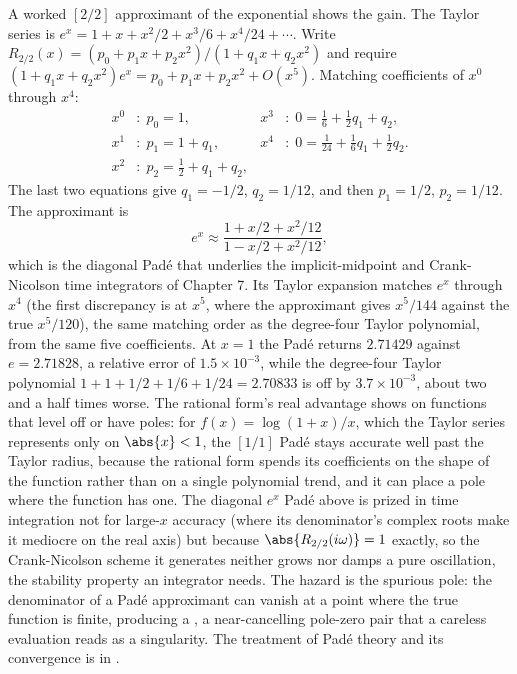 A worked $[2/2]$ approximant of the exponential shows the gain. The
Taylor series is $e^{x} = 1 + x + x^{2}/2 + x^{3}/6 + x^{4}/24 +
\cdots$. Write $R_{2/2}(x) = (p_{0} + p_{1} x + p_{2} x^{2})/(1 + q_{1}
x + q_{2} x^{2})$ and require $(1 + q_{1} x + q_{2} x^{2}) e^{x} = p_{0}
+ p_{1} x + p_{2} x^{2} + O(x^{5})$. Matching coefficients of $x^{0}$
through $x^{4}$:
\begin{align*}
x^{0}&: \; p_{0} = 1, & x^{3}&: \; 0 = \tfrac{1}{6} +
\tfrac{1}{2} q_{1} + q_{2}, \\
x^{1}&: \; p_{1} = 1 + q_{1}, & x^{4}&: \; 0 = \tfrac{1}{24} +
\tfrac{1}{6} q_{1} + \tfrac{1}{2} q_{2}. \\
x^{2}&: \; p_{2} = \tfrac{1}{2} + q_{1} + q_{2},
\end{align*}
The last two equations give $q_{1} = -1/2$, $q_{2} = 1/12$, and then
$p_{1} = 1/2$, $p_{2} = 1/12$. The approximant is
\[
e^{x} \approx \frac{1 + x/2 + x^{2}/12}{1 - x/2 + x^{2}/12},
\]
which is the diagonal Pad\'{e} that underlies the implicit-midpoint and
Crank-Nicolson time integrators of Chapter 7. Its Taylor expansion
matches $e^{x}$ through $x^{4}$ (the first discrepancy is at $x^{5}$,
where the approximant gives $x^{5}/144$ against the true $x^{5}/120$),
the same matching order as the degree-four Taylor polynomial, from the
same five coefficients. At $x = 1$ the Pad\'{e} returns $2.71429$
against $e = 2.71828$, a relative error of $1.5 \times 10^{-3}$, while
the degree-four Taylor polynomial $1 + 1 + 1/2 + 1/6 + 1/24 = 2.70833$
is off by $3.7 \times 10^{-3}$, about two and a half times worse. The
rational form's real advantage shows on functions that level off or
have poles: for $f(x) = \log(1 + x)/x$, which the Taylor series
represents only on $\abs{x} < 1$, the $[1/1]$ Pad\'{e} stays accurate
well past the Taylor radius, because the rational form spends its
coefficients on the shape of the function rather than on a single
polynomial trend, and it can place a pole where the function has one.
The diagonal $e^{x}$ Pad\'{e} above is prized in time integration not
for large-$x$ accuracy (where its denominator's complex roots make it
mediocre on the real axis) but because $\abs{R_{2/2}(i\omega)} = 1$
exactly, so the Crank-Nicolson scheme it generates neither grows nor
damps a pure oscillation, the stability property an integrator needs. The hazard is the spurious pole: the
denominator of a Pad\'{e} approximant can vanish at a point where the
true function is finite, producing a , a
near-cancelling pole-zero pair that a careless evaluation reads as a
singularity. The treatment of Pad\'{e} theory and its convergence is in
\cite{text:v2ch04-bender-orszag-1999}.


